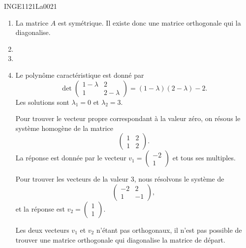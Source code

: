 

\begin{corrige}{INGE1121La0021}

	\begin{enumerate}

		\item
			La matrice $A$ est symétrique. Il existe donc une matrice orthogonale qui la diagonalise.
		\item
		\item
		\item
			Le polynôme caractéristique est donné par
			\begin{equation}
				\det\begin{pmatrix}
					1-\lambda	&	2	\\ 
					1	&	2-\lambda	
				\end{pmatrix}=(1-\lambda)(2-\lambda)-2.
			\end{equation}
			Les solutions sont $\lambda_1=0$ et $\lambda_2=3$.

			Pour trouver le vecteur propre correspondant à la valeur zéro, on résous le système homogène de la matrice
			\begin{equation}
				\begin{pmatrix}
					1	&	2	\\ 
					1	&	2	
				\end{pmatrix}.
			\end{equation}
			La réponse est donnée par le vecteur $v_1=\begin{pmatrix}
				-2	\\ 
				1	
			\end{pmatrix}$ et tous ses multiples.

			Pour trouver les vecteurs de la valeur $3$, nous résolvons le système de
			\begin{equation}
				\begin{pmatrix}
					-2	&	2	\\ 
					1	&	-1	
				\end{pmatrix},
			\end{equation}
			et la réponse est $v_2=\begin{pmatrix}
				1	\\ 
				1	
			\end{pmatrix}$.

			Les deux vecteurs $v_1$ et $v_2$ n'étant pas orthogonaux, il n'est pas possible de trouver une matrice orthogonale qui diagonalise la matrice de départ.

	\end{enumerate}

\end{corrige}
